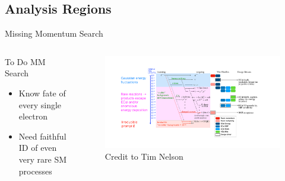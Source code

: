 \documentclass[aspectratio=169]{beamer}
\begin{document}
\subsection{Analysis Regions}
\begin{frame}{Missing Momentum Search}
  \begin{columns}
    \begin{column}{0.25\textwidth}
      \begin{block}{To Do MM Search}
        \begin{itemize}
          \item Know fate of every single electron
          \item Need faithful ID of even very rare SM processes
        \end{itemize}
      \end{block}
    \end{column}
    \begin{column}{0.7\textwidth}
      \begin{figure}
        \centering
        \includegraphics[width=\textwidth]{../figures/ldmx/experiment/reaction_staircase_with_designDrivers.pdf}
        \caption{Credit to Tim Nelson}
      \end{figure}
    \end{column}
  \end{columns}
\end{frame}
\end{document}
